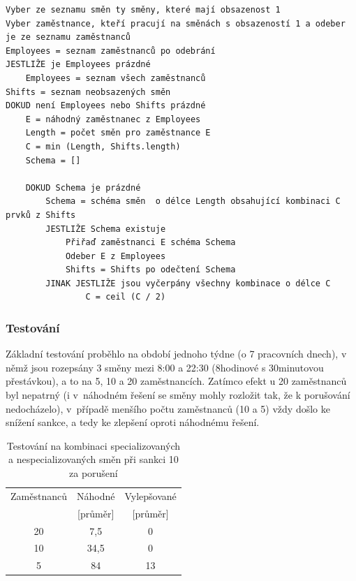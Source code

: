 \documentclass[twoside]{ctuthesis}
\begin{document}
\begin{enumerate}[label=\textbf{O\arabic*.}]
\begin{lstlisting}[caption={Pseudokód pro vylepšování obsazení všech směn}]
Vyber ze seznamu směn ty směny, které mají obsazenost 1
Vyber zaměstnance, kteří pracují na směnách s obsazeností 1 a odeber je ze seznamu zaměstnanců
Employees = seznam zaměstnanců po odebrání
JESTLIŽE je Employees prázdné
	Employees = seznam všech zaměstnanců
Shifts = seznam neobsazených směn
DOKUD není Employees nebo Shifts prázdné
	E = náhodný zaměstnanec z Employees
	Length = počet směn pro zaměstnance E
	C = min (Length, Shifts.length)
	Schema = []

	DOKUD Schema je prázdné
		Schema = schéma směn  o délce Length obsahující kombinaci C prvků z Shifts
		JESTLIŽE Schema existuje
			Přiřaď zaměstnanci E schéma Schema
			Odeber E z Employees
			Shifts = Shifts po odečtení Schema
		JINAK JESTLIŽE jsou vyčerpány všechny kombinace o délce C
				C = ceil (C / 2)
\end{lstlisting}

\subsubsection{Testování}

Základní testování proběhlo na období jednoho týdne (o 7 pracovních dnech), v němž jsou rozepsány 3 směny mezi 8:00 a 22:30 (8hodinové s 30minutovou přestávkou), a to na 5, 10 a 20 zaměstnancích. Zatímco efekt u 20 zaměstnanců byl nepatrný (i v~náhodném řešení se směny mohly rozložit tak, že k porušování nedocházelo), v~případě menšího počtu zaměstnanců (10 a 5) vždy došlo ke snížení sankce, a tedy ke zlepšení oproti náhodnému řešení.


\begin{table}[h!]
\begin{tabular}{|c|c|c|}
	\hline
	Zaměstnanců & Náhodné & Vylepšované \\
	& [průměr] & [průměr] \\
	\hline
	20 & 7,5 & 0 \\
	10 & 34,5 & 0 \\
	5 & 84 & 13 \\
	\hline
\end{tabular}
	\caption{Testování na kombinaci specializovaných a nespecializovaných směn při sankci 10 za porušení}
	\label{tab:noemptyunspecialized}
\end{table}


\end{enumerate}
\end{document}
